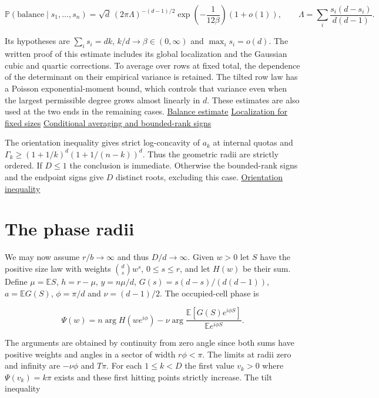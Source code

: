 \begin{equation*}
\mathbb P(\mathrm{balance}\mid s_1,\ldots,s_n)
=\sqrt d\,(2\pi\Lambda)^{-(d-1)/2}
\exp\left(-\frac1{12\beta}\right)(1+o(1)),\qquad
\Lambda=\sum_i \frac{s_i(d-s_i)}{d(d-1)} .
\end{equation*}

Its hypotheses are $\sum_i s_i=dk$, $k/d\to\beta\in(0,\infty)$ and $\max_i s_i=o(d)$. The written proof of this estimate includes its global localization and the Gaussian cubic and quartic corrections. To average over rows at fixed total, the dependence of the determinant on their empirical variance is retained. The tilted row law has a Poisson exponential-moment bound, which controls that variance even when the largest permissible degree grows almost linearly in $d$. These estimates are also used at the two ends in the remaining cases. \hyperref[sec:sparse-fixed-profile-edgeworth]{Balance estimate} \enspace \hyperref[sec:sparse-fixed-profile-global-localization]{Localization for fixed sizes} \enspace \hyperref[sec:edgeworth-bounded-rank-ratio]{Conditional averaging and bounded-rank signs}

The orientation inequality gives strict log-concavity of $a_k$ at internal quotas and $\Gamma_k\ge(1+1/k)^d(1+1/(n-k))^d$. Thus the geometric radii are strictly ordered. If $D\le1$ the conclusion is immediate. Otherwise the bounded-rank signs and the endpoint signs give $D$ distinct roots, excluding this case. \href{https://github.com/ProgramComputer/open-math-research/blob/4fb624ba937a8eecc1361a6066185cd81ab7b172/topics/balanced-arrays/orientation-normalization.md}{Orientation inequality}

\section{The phase radii}

We may now assume $r/b\to\infty$ and thus $D/d\to\infty$. Given $w>0$ let $S$ have the positive size law with weights $\binom ds w^s$, $0\le s\le r$, and let $H(w)$ be their sum. Define $\mu=\mathbb ES$, $h=r-\mu$, $y=n\mu/d$, $G(s)=s(d-s)/(d(d-1))$, $a=\mathbb E G(S)$, $\phi=\pi/d$ and $\nu=(d-1)/2$. The occupied-cell phase is

\begin{equation*}
\Psi(w)=n\arg H(we^{i\phi})-
\nu\arg\frac{\mathbb E[G(S)e^{i\phi S}]}{\mathbb E e^{i\phi S}} .
\end{equation*}

The arguments are obtained by continuity from zero angle since both sums have positive weights and angles in a sector of width $r\phi<\pi$. The limits at radii zero and infinity are $-\nu\phi$ and $T\pi$. For each $1\le k<D$ the first value $v_k>0$ where $\Psi(v_k)=k\pi$ exists and these first hitting points strictly increase. The tilt inequality

